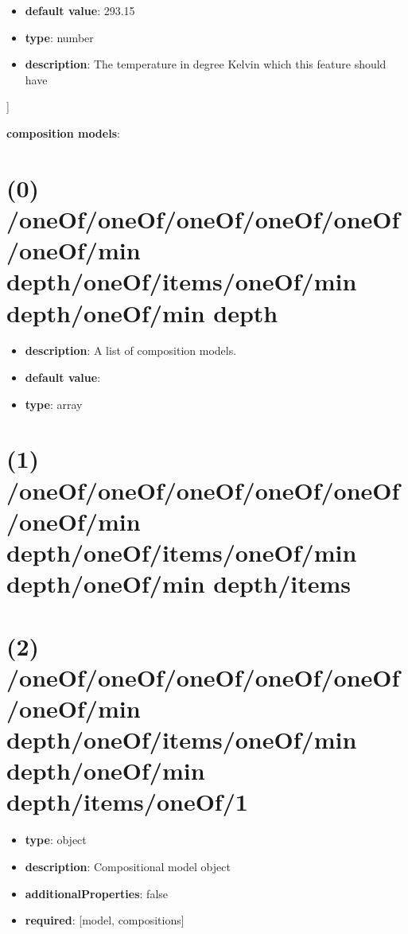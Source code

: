 \begin{itemize}[leftmargin=1em]\item {\bf default value}: 293.15
\item {\bf type}: number
\item {\bf description}: The temperature in degree Kelvin which this feature should have
\end{itemize}]\item {\bf composition models}: \section{(0) /oneOf/oneOf/oneOf/oneOf/oneOf/oneOf/min depth/oneOf/items/oneOf/min depth/oneOf/min depth}
\begin{itemize}[leftmargin=0em]\item {\bf description}: A list of composition models.
\item {\bf default value}: 
\item {\bf type}: array
\end{itemize}\section{(1) /oneOf/oneOf/oneOf/oneOf/oneOf/oneOf/min depth/oneOf/items/oneOf/min depth/oneOf/min depth/items}

\section{(2) /oneOf/oneOf/oneOf/oneOf/oneOf/oneOf/min depth/oneOf/items/oneOf/min depth/oneOf/min depth/items/oneOf/1}
\begin{itemize}[leftmargin=2em]\item {\bf type}: object
\item {\bf description}: Compositional model object
\item {\bf additionalProperties}: false
\item {\bf required}: [model, compositions]\end{itemize}
